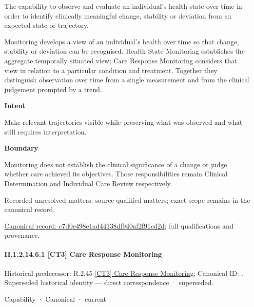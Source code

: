 The capability to observe and evaluate an individual's health state over time in order to identify clinically meaningful change, stability or deviation from an expected state or trajectory.



Monitoring develops a view of an individual's health over time so that change, stability or deviation can be recognised. Health State Monitoring establishes the aggregate temporally situated view; Care Response Monitoring considers that view in relation to a particular condition and treatment. Together they distinguish observation over time from a single measurement and from the clinical judgement prompted by a trend.



\textbf{Intent}



Make relevant trajectories visible while preserving what was observed and what still requires interpretation.



\textbf{Boundary}



Monitoring does not establish the clinical significance of a change or judge whether care achieved its objectives. Those responsibilities remain Clinical Determination and Individual Care Review respectively.


{\small Recorded unresolved matters: source-qualified matters; exact scope remains in the canonical record.}\par
{\footnotesize \href{../../../../../../../continuum/strategy/capability/c7d0e498e1ad44138df940af2f91cd2d.md}{Canonical record: c7d0e498e1ad44138df940af2f91cd2d}; full qualifications and provenance.}\par
\paragraph*{II.1.2.14.6.1 [CT3] Care Response Monitoring}
\label{navigation:II.1.2.14.6.1}

{\small Historical predecessor: R.2.45 \hyperref[element:615f93d05fbb4a8481f07778bd4f4803]{[CT3] Care Response Monitoring}; Canonical ID: \texttt{}. Superseded historical identity — direct correspondence · superseded.}\par
\label{element:d6951c9357fa40a4943cde581d95d5b1}
{\small Capability · Canonical · current}\par


